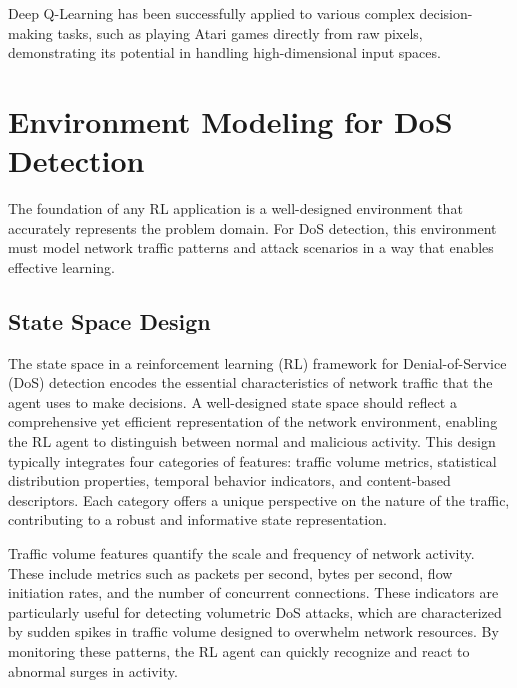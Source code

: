 \documentclass{report}
\begin{document}
Deep Q-Learning has been successfully applied to various complex decision-making tasks, such as playing Atari games directly from raw pixels, demonstrating its potential in handling high-dimensional input spaces.



\section{Environment Modeling for DoS Detection}

The foundation of any RL application is a well-designed environment that accurately represents the problem domain. For DoS detection, this environment must model network traffic patterns and attack scenarios in a way that enables effective learning.

\subsection{State Space Design}

The state space in a reinforcement learning (RL) framework for Denial-of-Service (DoS) detection encodes the essential characteristics of network traffic that the agent uses to make decisions. A well-designed state space should reflect a comprehensive yet efficient representation of the network environment, enabling the RL agent to distinguish between normal and malicious activity. This design typically integrates four categories of features: traffic volume metrics, statistical distribution properties, temporal behavior indicators, and content-based descriptors. Each category offers a unique perspective on the nature of the traffic, contributing to a robust and informative state representation.

Traffic volume features quantify the scale and frequency of network activity. These include metrics such as packets per second, bytes per second, flow initiation rates, and the number of concurrent connections. These indicators are particularly useful for detecting volumetric DoS attacks, which are characterized by sudden spikes in traffic volume designed to overwhelm network resources. By monitoring these patterns, the RL agent can quickly recognize and react to abnormal surges in activity.
\end{document}
